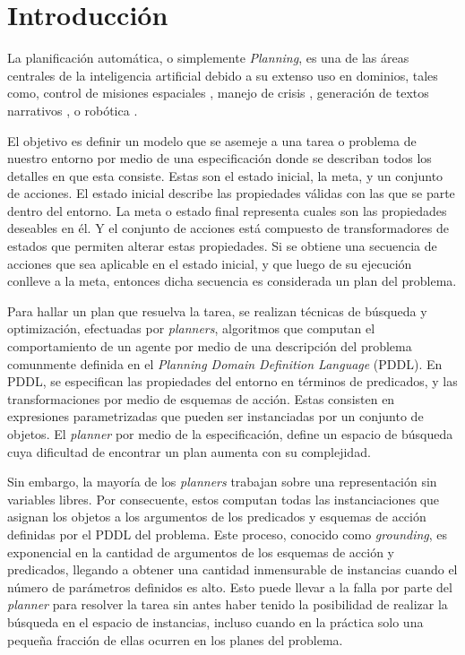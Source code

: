 \chapter{Introducción}
\label{ch:into}

La planificación automática, o simplemente \emph{Planning}, es una de las áreas
centrales de la inteligencia artificial debido a su extenso uso en dominios,
tales como, control de misiones espaciales \citep{RabideauG-et-al-2001}, manejo
de crisis \citep{Bienkowki-1995}, generación de textos narrativos
\citep{Goudoulakis-et-al-2016}, o robótica \citep{Munoz-et-al-2016}.

El objetivo es definir un modelo que se asemeje a una tarea o problema de
nuestro entorno por medio de una especificación donde se describan todos los
detalles en que esta consiste. Estas son el estado inicial, la meta, y un
conjunto de acciones. El estado inicial describe las propiedades válidas con las
que se parte dentro del entorno. La meta o estado final representa cuales son
las propiedades deseables en él. Y el conjunto de acciones está compuesto de
transformadores de estados que permiten alterar estas propiedades. Si se obtiene
una secuencia de acciones que sea aplicable en el estado inicial, y que luego de
su ejecución conlleve a la meta, entonces dicha secuencia es considerada un plan
del problema. \citep{Georgievski-et-al-2016}

Para hallar un plan que resuelva la tarea, se realizan técnicas de búsqueda y
optimización, efectuadas por \emph{planners}, algoritmos que computan el
comportamiento de un agente por medio de una descripción del problema comunmente
definida en el \emph{Planning Domain Definition Language} (PDDL). En PDDL, se
especifican las propiedades del entorno en términos de predicados, y las
transformaciones por medio de esquemas de acción. Estas consisten en expresiones
parametrizadas que pueden ser instanciadas por un conjunto de objetos. El
\emph{planner} por medio de la especificación, define un espacio de búsqueda
cuya dificultad de encontrar un plan aumenta con su complejidad.
\citep{Georgievski-et-al-2016}

Sin embargo, la mayoría de los \emph{planners} trabajan sobre una representación
sin variables libres. Por consecuente, estos computan todas las instanciaciones
que asignan los objetos a los argumentos de los predicados y esquemas de acción
definidas por el PDDL del problema. Este proceso, conocido como
\emph{grounding}, es exponencial en la cantidad de argumentos de los esquemas de
acción y predicados, llegando a obtener una cantidad inmensurable de instancias
cuando el número de parámetros definidos es alto. Esto puede llevar a la falla
por parte del \emph{planner} para resolver la tarea sin antes haber tenido la
posibilidad de realizar la búsqueda en el espacio de instancias, incluso cuando
en la práctica solo una pequeña fracción de ellas ocurren en los planes del
problema.
\citep{Gnad_Torralba_Dominguez_Areces_Bustos_2019}

